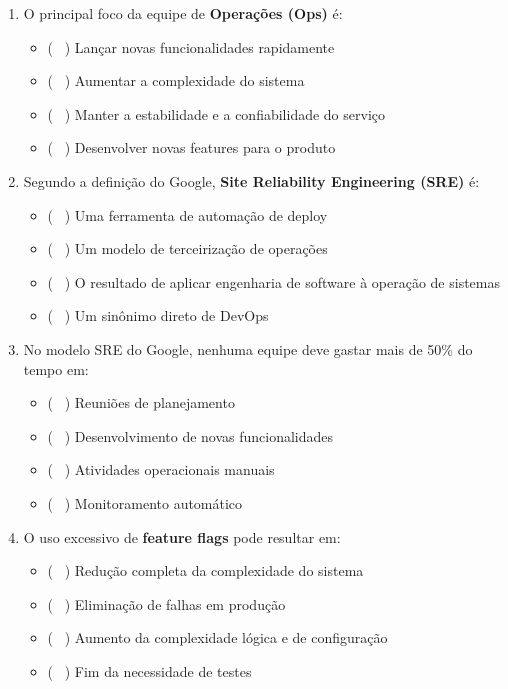 \documentclass[12pt]{article}
\begin{document}
    \begin{enumerate}[label=\textbf{\arabic*.}]
    \item O principal foco da equipe de \textbf{Operações (Ops)} é:
    \begin{itemize}
      \item ( \ ) Lançar novas funcionalidades rapidamente
    \item ( \ ) Aumentar a complexidade do sistema
    \item ( \ ) Manter a estabilidade e a confiabilidade do serviço
    \item ( \ ) Desenvolver novas features para o produto
\end{itemize}

\item Segundo a definição do Google, \textbf{Site Reliability Engineering (SRE)} é:
\begin{itemize}
    \item ( \ ) Uma ferramenta de automação de deploy
    \item ( \ ) Um modelo de terceirização de operações
    \item ( \ ) O resultado de aplicar engenharia de software à operação de sistemas
    \item ( \ ) Um sinônimo direto de DevOps
\end{itemize}

\item No modelo SRE do Google, nenhuma equipe deve gastar mais de 50\% do tempo em:
\begin{itemize}
    \item ( \ ) Reuniões de planejamento
    \item ( \ ) Desenvolvimento de novas funcionalidades
    \item ( \ ) Atividades operacionais manuais
    \item ( \ ) Monitoramento automático
\end{itemize}

\item O uso excessivo de \textbf{feature flags} pode resultar em:
\begin{itemize}
    \item ( \ ) Redução completa da complexidade do sistema
    \item ( \ ) Eliminação de falhas em produção
    \item ( \ ) Aumento da complexidade lógica e de configuração
    \item ( \ ) Fim da necessidade de testes
\end{itemize}
\end{enumerate}
\end{document}
